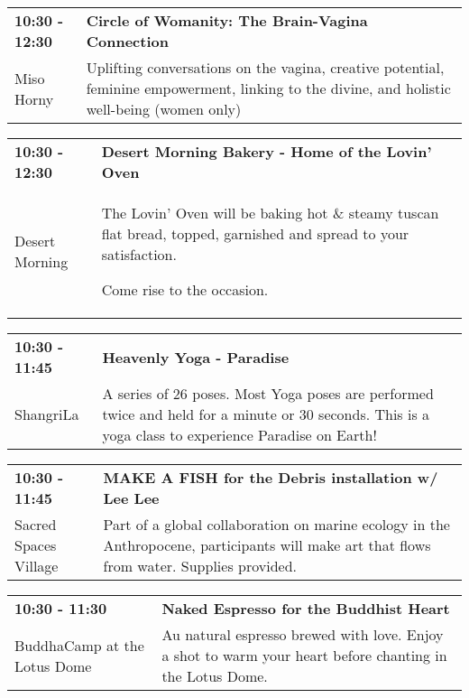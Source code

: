 \begin{tabular}{ p{1in} p{2.2in} }
    \textbf{10:30 - 12:30} & \textbf{Circle of Womanity: The Brain-Vagina Connection} \\
    Miso Horny \newline  & Uplifting conversations on the vagina, creative potential, feminine empowerment, linking to the divine, and holistic well-being (women only) \\
    \hline 
\end{tabular}
    
\begin{tabular}{ p{1in} p{2.2in} }
    \textbf{10:30 - 12:30} & \textbf{Desert Morning Bakery - Home of the Lovin' Oven} \\
    Desert Morning \newline  & The Lovin' Oven will be baking hot \& steamy tuscan flat bread, topped, garnished and spread to your satisfaction.

Come rise to the occasion. \\
    \hline 
\end{tabular}
    
\begin{tabular}{ p{1in} p{2.2in} }
    \textbf{10:30 - 11:45} & \textbf{Heavenly Yoga - Paradise} \\
    ShangriLa \newline  & A series of 26 poses. Most Yoga poses are performed twice and held for a minute or 30 seconds. This is a yoga class to experience Paradise on Earth! \\
    \hline 
\end{tabular}
    
\begin{tabular}{ p{1in} p{2.2in} }
    \textbf{10:30 - 11:45} & \textbf{MAKE A FISH for the Debris installation w/ Lee Lee} \\
    Sacred Spaces Village \newline  & Part of a global collaboration on marine ecology in the Anthropocene, participants will make art that flows from water. Supplies provided. \\
    \hline 
\end{tabular}
    
\begin{tabular}{ p{1in} p{2.2in} }
    \textbf{10:30 - 11:30} & \textbf{Naked Espresso for the Buddhist Heart} \\
    BuddhaCamp at the Lotus Dome \newline  & Au natural espresso brewed with love.  Enjoy a shot to warm your heart before  chanting in the Lotus Dome. \\
    \hline 
\end{tabular}
    
